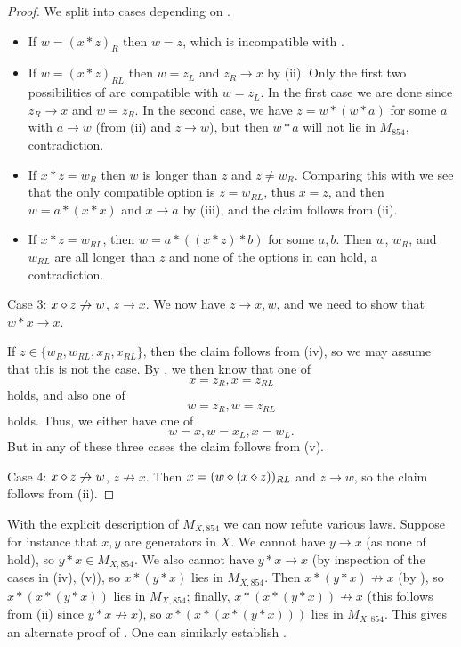\begin{proof}
We split into cases depending on .
\begin{itemize}
\item If $w = (x*z)_R$ then $w=z$, which is incompatible with .
\item If $w = (x*z)_{RL}$ then $w = z_L$ and $z_R \to x$ by (ii). Only the first two possibilities of  are compatible with $w=z_L$.  In the first case we are done since $z_R \to x$ and $w = z_R$.  In the second case, we have $z = w * (w * a)$ for some $a$ with $a \to w$ (from (ii) and $z \to w$), but then $w * a$ will not lie in $M_{854}$, contradiction.
\item If $x*z = w_R$  then $w$ is longer than $z$ and $z \neq w_R$.  Comparing this with  we see that the only compatible option is $z = w_{RL}$, thus $x=z$, and then $w = a * (x * x)$ and $x \to a$ by (iii), and the claim follows from (ii).
\item If $x * z = w_{RL}$, then $w = a * ((x *z) * b)$ for some $a,b$.  Then $w$, $w_R$, and $w_{RL}$ are all longer than $z$ and none of the options in  can hold, a contradiction.
\end{itemize}



Case 3: $x \diamond z \not \to w$, $z \to x$.  We now have $z \to x, w$, and we need to show that $w * x \to x$.

If $z \in \{ w_R, w_{RL}, x_R, x_{RL} \}$, then the claim follows from (iv), so we may assume that this is not the case.
By , we then know that one of
$$ x = z_R, x = z_{RL}$$
holds, and also one of
$$
 w =  z_R, w = z_{RL}$$
 holds. Thus, we either have one of
$$ w = x, w = x_L, x = w_L.$$
But in any of these three cases the claim follows from (v).

Case 4: $x \diamond z \not \to w$, $z \not \to x$.  Then $x = (w \diamond (x \diamond z))_{RL}$ and $z \to w$, so the claim follows from (ii).

\end{proof}

With the explicit description of $M_{X,854}$ we can now refute various laws.  Suppose for instance that $x,y$ are generators in $X$.  We cannot have $y \to x$ (as none of  hold), so $y * x \in M_{X,854}$.  We also cannot have $y * x \to x$ (by inspection of the cases in (iv), (v)), so $x * (y * x)$ lies in $M_{X,854}$.  Then $x * (y * x) \not \to x$ (by ), so $x * (x * (y * x))$ lies in $M_{X,854}$; finally, $x * (x * (y * x)) \not \to x$ (this follows from (ii) since $y * x \not \to x$), so $x * (x * (x * (y * x)))$ lies in $M_{X,854}$.  This gives an alternate proof of .  One can similarly establish .
